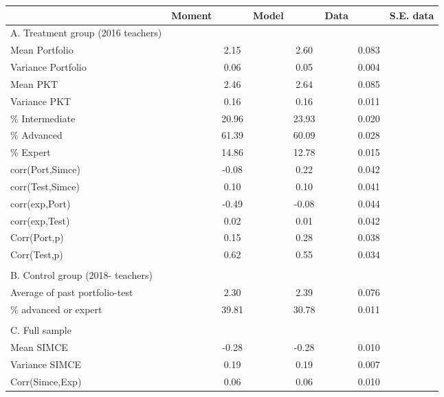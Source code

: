 \footnotesize{
\begin{tabular}{llccccc}
\toprule
& Moment &  & Model &  & Data  &  & S.E. data \\
\midrule
A. Treatment group  (2016 teachers) &  &       &  &       &  & \\
Mean Portfolio                      &  & 2.15 &  & 2.60   &  & 0.083 \\
Variance Portfolio                  &  & 0.06 &  & 0.05   &  & 0.004 \\
Mean PKT                            &  & 2.46 &  & 2.64   &  & 0.085 \\
Variance PKT                        &  & 0.16 &  & 0.16   &  & 0.011 \\
\% Intermediate                     &  & 20.96 &  & 23.93   &  & 0.020 \\
\% Advanced                         &  & 61.39 &  & 60.09   &  & 0.028 \\
\% Expert                           &  & 14.86 &  & 12.78   &  & 0.015 \\
corr(Port,Simce)                    &  & -0.08 &  & 0.22   &  & 0.042 \\
corr(Test,Simce)                    &  & 0.10 &  & 0.10   &  & 0.041 \\
corr(exp,Port)                      &  & -0.49 &  & -0.08   &  & 0.044 \\
corr(exp,Test)                      &  & 0.02 &  & 0.01   &  & 0.042 \\
Corr(Port,p)                        &  & 0.15 &  & 0.28   &  & 0.038 \\
Corr(Test,p)                        &  & 0.62 &  & 0.55   &  & 0.034 \\
                                    &  &       &  &       &  &       \\
B. Control group (2018- teachers)   &  &       &  &       &  &       \\
Average of past portfolio-test      &  & 2.30 &  & 2.39   &  & 0.076 \\
\% advanced or expert               &  & 39.81 &  & 30.78   &  & 0.011 \\
                                    &  &       &  &       &  &       \\
C. Full sample                      &  &       &  &       &  &       \\
Mean SIMCE                          &  & -0.28 &  & -0.28   &  & 0.010 \\
Variance SIMCE                      &  & 0.19 &  & 0.19   &  & 0.007 \\
Corr(Simce,Exp)                     &  & 0.06 &  & 0.06   &  & 0.010 \\
\bottomrule
\end{tabular}
}
